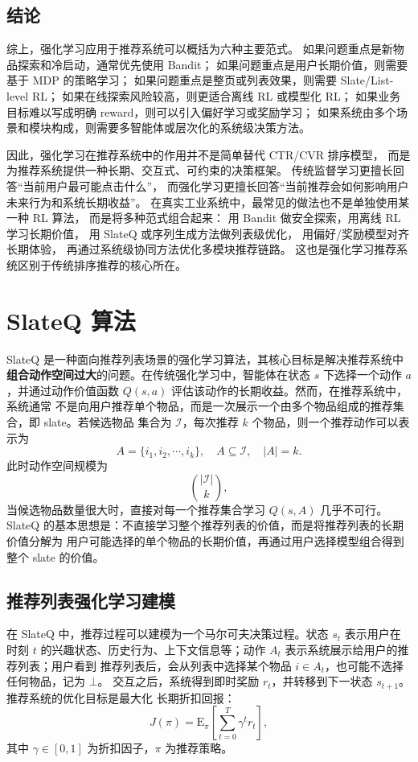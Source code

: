 \documentclass[11pt]{ctexart}
\begin{document}
\subsection{结论}

综上，强化学习应用于推荐系统可以概括为六种主要范式。
如果问题重点是新物品探索和冷启动，通常优先使用 Bandit；
如果问题重点是用户长期价值，则需要基于 MDP 的策略学习；
如果问题重点是整页或列表效果，则需要 Slate/List-level RL；
如果在线探索风险较高，则更适合离线 RL 或模型化 RL；
如果业务目标难以写成明确 reward，则可以引入偏好学习或奖励学习；
如果系统由多个场景和模块构成，则需要多智能体或层次化的系统级决策方法。

因此，强化学习在推荐系统中的作用并不是简单替代 CTR/CVR 排序模型，
而是为推荐系统提供一种长期、交互式、可约束的决策框架。
传统监督学习更擅长回答``当前用户最可能点击什么''，
而强化学习更擅长回答``当前推荐会如何影响用户未来行为和系统长期收益''。
在真实工业系统中，最常见的做法也不是单独使用某一种 RL 算法，
而是将多种范式组合起来：
用 Bandit 做安全探索，用离线 RL 学习长期价值，
用 SlateQ 或序列生成方法做列表级优化，
用偏好/奖励模型对齐长期体验，
再通过系统级协同方法优化多模块推荐链路。
这也是强化学习推荐系统区别于传统排序推荐的核心所在。

\section{SlateQ 算法}

SlateQ 是一种面向推荐列表场景的强化学习算法，其核心目标是解决推荐系统中
\textbf{组合动作空间过大}的问题。在传统强化学习中，智能体在状态 $s$ 下选择一个动作
$a$，并通过动作价值函数 $Q(s,a)$ 评估该动作的长期收益。然而，在推荐系统中，系统通常
不是向用户推荐单个物品，而是一次展示一个由多个物品组成的推荐集合，即 slate。若候选物品
集合为 $\mathcal{I}$，每次推荐 $k$ 个物品，则一个推荐动作可以表示为
\[
A=\{i_1,i_2,\cdots,i_k\}, \quad A\subseteq \mathcal{I}, \quad |A|=k .
\]
此时动作空间规模为
\[
\binom{|\mathcal{I}|}{k},
\]
当候选物品数量很大时，直接对每一个推荐集合学习 $Q(s,A)$ 几乎不可行。
SlateQ 的基本思想是：不直接学习整个推荐列表的价值，而是将推荐列表的长期价值分解为
用户可能选择的单个物品的长期价值，再通过用户选择模型组合得到整个 slate 的价值。

\subsection{推荐列表强化学习建模}

在 SlateQ 中，推荐过程可以建模为一个马尔可夫决策过程。状态 $s_t$ 表示用户在时刻 $t$
的兴趣状态、历史行为、上下文信息等；动作 $A_t$ 表示系统展示给用户的推荐列表；用户看到
推荐列表后，会从列表中选择某个物品 $i\in A_t$，也可能不选择任何物品，记为 $\bot$。
交互之后，系统得到即时奖励 $r_t$，并转移到下一状态 $s_{t+1}$。推荐系统的优化目标是最大化
长期折扣回报：
\[
J(\pi)=
\mathrm{E}_{\pi}
\left[
\sum_{t=0}^{T}\gamma^t r_t
\right],
\]
其中 $\gamma\in[0,1]$ 为折扣因子，$\pi$ 为推荐策略。
\end{document}
